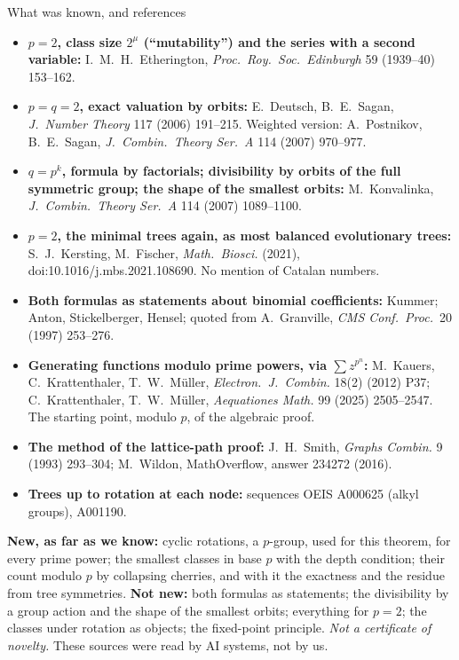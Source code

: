 \documentclass[aspectratio=169,11pt]{beamer}
\begin{document}
\begin{frame}{What was known, and references}
  \scriptsize
  \begin{itemize}\setlength{\itemsep}{0pt}
    \item \textbf{$p=2$, class size $2^{\mu}$ (``mutability'') and the series with a second variable:}
      I.~M.~H.~Etherington, \emph{Proc.\ Roy.\ Soc.\ Edinburgh} 59 (1939--40) 153--162.
    \item \textbf{$p=q=2$, exact valuation by orbits:} E.~Deutsch, B.~E.~Sagan,
      \emph{J.\ Number Theory} 117 (2006) 191--215. Weighted version: A.~Postnikov,
      B.~E.~Sagan, \emph{J.\ Combin.\ Theory Ser.\ A} 114 (2007) 970--977.
    \item \textbf{$q=p^k$, formula by factorials; divisibility by orbits of the full
      symmetric group; the shape of the smallest orbits:} M.~Konvalinka,
      \emph{J.\ Combin.\ Theory Ser.\ A} 114 (2007) 1089--1100.
    \item \textbf{$p=2$, the minimal trees again, as most balanced evolutionary trees:}
      S.~J.~Kersting, M.~Fischer, \emph{Math.\ Biosci.} (2021),
      doi:10.1016/j.mbs.2021.108690. No mention of Catalan numbers.
    \item \textbf{Both formulas as statements about binomial coefficients:} Kummer; Anton, Stickelberger,
      Hensel; quoted from A.~Granville, \emph{CMS Conf.\ Proc.}\ 20 (1997) 253--276.
    \item \textbf{Generating functions modulo prime powers, via $\sum z^{p^n}$:}
      M.~Kauers, C.~Krattenthaler, T.~W.~M\"uller, \emph{Electron.\ J.\ Combin.} 18(2)
      (2012) P37; C.~Krattenthaler, T.~W.~M\"uller, \emph{Aequationes Math.} 99 (2025)
      2505--2547. The starting point, modulo $p$, of the algebraic proof.
    \item \textbf{The method of the lattice-path proof:} J.~H.~Smith, \emph{Graphs Combin.} 9 (1993)
      293--304; M.~Wildon, MathOverflow, answer 234272 (2016).
    \item \textbf{Trees up to rotation at each node:} sequences OEIS A000625 (alkyl groups), A001190.
  \end{itemize}
  \textbf{New, as far as we know:} cyclic rotations, a $p$-group, used for this theorem, for every
  prime power; the smallest classes in base $p$ with the depth condition; their count modulo $p$ by
  collapsing cherries, and with it the exactness and the residue from tree symmetries.
  \textbf{Not new:} both formulas as statements; the divisibility by a group action and the shape of the
  smallest orbits; everything for $p=2$; the classes under rotation as objects; the fixed-point principle.
  \emph{Not a certificate of novelty.} These sources were read by AI systems, not by us.
\end{frame}
\end{document}
